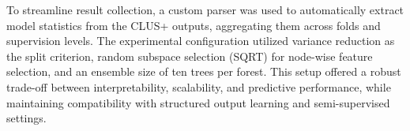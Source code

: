 To streamline result collection, a custom parser was used to automatically extract model statistics from the CLUS+ outputs, aggregating them across folds and supervision levels. The experimental configuration utilized variance reduction as the split criterion, random subspace selection (SQRT) for node-wise feature selection, and an ensemble size of ten trees per forest. This setup offered a robust trade-off between interpretability, scalability, and predictive performance, while maintaining compatibility with structured output learning and semi-supervised settings.

